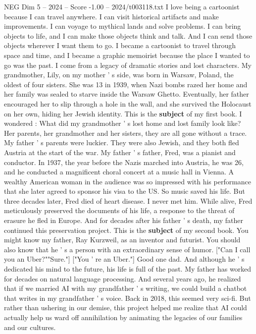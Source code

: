 \begin{textsample}{NEG Dim 5 – 2024 – Score -1.00 – 2024/t003118.txt}  \label{ex:f5_neg_014}
I love being a cartoonist because I can travel anywhere.
I can visit historical artifacts and make improvements.
I can voyage to mythical lands and solve problems.
I can bring objects to life, and I can make those objects think and talk.
And I can send those objects wherever I want them to go.
I became a cartoonist to travel through space and time, and I became a graphic memoirist because the place I wanted to go was the past.
I come from a legacy of dramatic stories and lost characters.
My grandmother, Lily, on my mother ' s side, was born in Warsaw, Poland, the oldest of four sisters.
She was 13 in 1939, when Nazi bombs razed her home and her family was sealed to starve inside the Warsaw Ghetto.
Eventually, her father encouraged her to slip through a hole in the wall, and she survived the Holocaust on her own, hiding her Jewish identity.
This is the \textbf{subject} of my first book.
I wondered : What did my grandmother ' s lost home and lost family look like?
Her parents, her grandmother and her sisters, they are all gone without a trace.
My father ' s parents were luckier.
They were also Jewish, and they both fled Austria at the start of the war.
My father ' s father, Fred, was a pianist and conductor.
In 1937, the year before the Nazis marched into Austria, he was 26, and he conducted a magnificent choral concert at a music hall in Vienna.
A wealthy American woman in the audience was so impressed with his performance that she later agreed to sponsor his visa to the US.
So music saved his life.
But three decades later, Fred died of heart disease.
I never met him.
While alive, Fred meticulously preserved the documents of his life, a response to the threat of erasure he fled in Europe.
And for decades after his father ' s death, my father continued this preservation project.
This is the \textbf{subject} of my second book.
You might know my father, Ray Kurzweil, as an inventor and futurist.
You should also know that he ' s a person with an extraordinary sense of humor. ["Can I call you an Uber?""Sure."] ["You ' re an Uber."] Good one dad.
And although he ' s dedicated his mind to the future, his life is full of the past.
My father has worked for decades on natural language processing.
And several years ago, he realized that if we married AI with my grandfather ' s writing, we could build a chatbot that writes in my grandfather ' s voice.
Back in 2018, this seemed very sci-fi.
But rather than ushering in our demise, this project helped me realize that AI could actually help us ward off annihilation by animating the legacies of our families and our cultures.

\end{textsample}
